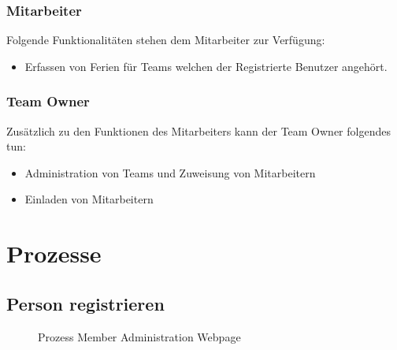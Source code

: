 \subsubsection{Mitarbeiter}
Folgende Funktionalit\"aten stehen dem Mitarbeiter zur Verf\"ugung:
\begin{itemize}
\item Erfassen von Ferien f\"ur Teams welchen der Registrierte Benutzer angeh\"ort.
\end{itemize}

\subsubsection{Team Owner}
Zus\"atzlich zu den Funktionen des Mitarbeiters kann der Team Owner folgendes tun:
\begin{itemize}
\item Administration von Teams und Zuweisung von Mitarbeitern
\item Einladen von Mitarbeitern
\end{itemize}

\section{Prozesse}\label{konzept:prozesse}
\subsection{Person registrieren}
 \begin{figure}[H]
  	\centering
 	\caption{Prozess Member Administration Webpage}
\end{figure}

